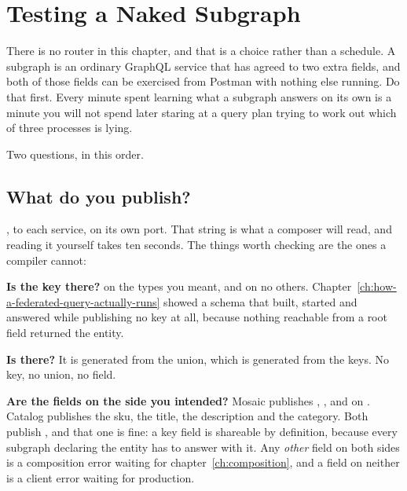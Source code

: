 \section{Testing a Naked Subgraph}
\label{sec:ch08-testing-a-naked-subgraph}
%

There is no router in this chapter, and that is a choice rather than a schedule.
A subgraph is an ordinary GraphQL service that has agreed to two extra fields,
and both of those fields can be exercised from Postman with nothing else
running. Do that first. Every minute spent learning what a subgraph answers on
its own is a minute you will not spend later staring at a query plan trying to
work out which of three processes is lying.

Two questions, in this order.

\subsection*{What do you publish?}

%
, to each service, on its own port. That string
is what a composer will read, and reading it yourself takes ten seconds. The
things worth checking are the ones a compiler cannot:

\medskip\noindent\textbf{Is the key there?}  on the
types you meant, and on no others.
Chapter~\ref{ch:how-a-federated-query-actually-runs} showed a schema that built,
started and answered while publishing no key at all, because nothing reachable
from a root field returned the entity.

\medskip\noindent\textbf{Is  there?} It is generated from the
 union, which is generated from the keys. No key, no union, no
field.

\medskip\noindent\textbf{Are the fields on the side you intended?} Mosaic
publishes , ,  and
 on . Catalog publishes the sku, the title,
the description and the category. Both publish , and that one is
fine: a key field is shareable by definition, because every subgraph declaring
the entity has to answer with it. Any \emph{other} field on both sides is a
composition error waiting for chapter~\ref{ch:composition}, and a field on
neither is a client error waiting for production.

